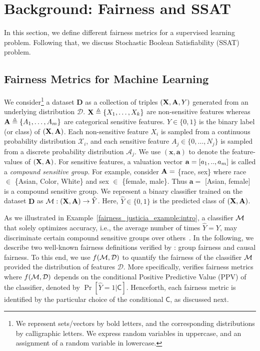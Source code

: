 \section{Background: Fairness and SSAT}
\label{fairness_justicia_sec:preliminaries}

In this section, we define different fairness metrics for a supervised learning problem. Following that, we discuss Stochastic Boolean Satisfiability (SSAT) problem.

\subsection{Fairness Metrics for Machine Learning}\label{fairness_justicia_sec:fairness}


We consider\footnote{{We represent sets/vectors by bold letters, and the corresponding distributions by calligraphic letters. We express random variables in uppercase, and an assignment of a random variable in lowercase.}} a dataset $ \mathbf{D} $ as a collection of triples $ (\mathbf{X}, \mathbf{A}, Y) $ generated from an underlying distribution $\mathcal{D}$. $ \mathbf{X} \triangleq \{X_1, \dots, X_{k}\} $ are non-sensitive features whereas $ \mathbf{A} \triangleq \{A_1, \dots, A_{m}\} $ are categorical sensitive features.  $Y \in \{0,1\}$ is the binary label (or class) of $(\mathbf{X},\mathbf{A})$. Each non-sensitive feature $ X_i$ is sampled from a continuous probability distribution {$ \mathcal{X}_i $}, and each sensitive feature $ A_j \in \{0, \dots, N_j\}  $ is sampled from a discrete probability distribution {$ \mathcal{A}_j $}. We use $ (\mathbf{x}, \mathbf{a}) $ to denote the feature-values of  $ (\mathbf{X}, \mathbf{A}) $.  For sensitive features, a valuation vector $ \mathbf{a} = [a_1, .., a_{m}] $ is called a \textit{compound sensitive group}. For example, consider $ \mathbf{A} = $ \{race, sex\} where race $ \in $ \{Asian, Color, White\} and sex $ \in $ \{female, male\}. Thus $ \mathbf{a} = $ [Asian, female]  is a compound sensitive group. 
We represent a binary classifier trained on the dataset $\mathbf{D}$ as $\mathcal{M}: (\mathbf{X}, \mathbf{A}) \rightarrow \hat{Y} $. Here, $\hat{Y} \in \{0,1\}$ is the predicted class of $ (\mathbf{X}, \mathbf{A}) $.



As we illustrated in Example~\ref{fairness_justicia_example:intro}, a classifier $\mathcal{M}$ that solely optimizes accuracy, i.e., the average number of times $\hat{Y} = Y$, may discriminate certain compound sensitive groups over others~\cite{chouldechova2020snapshot}. In the following, we describe two well-known fairness definitions verified by {\justicia}: group fairness and causal fairness. To this end, we use $ f(\mathcal{M}, \mathcal{D}) $ to quantify the fairness of the classifier $ \mathcal{M} $ provided the distribution of features $ \mathcal{D} $. More specifically,  {\justicia} verifies fairness metrics where $ f(\mathcal{M}, \mathcal{D}) $ depends on the conditional Positive Predictive Value (PPV) of the classifier, denoted by $ \Pr[\hat{Y} = 1 | \mathsf{C}] $. Henceforth, each fairness metric is identified by the particular choice of the conditional $ \mathsf{C} $, as discussed next.

